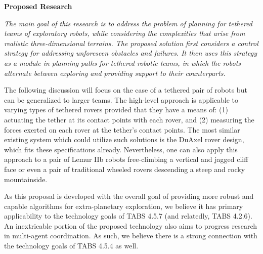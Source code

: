 \documentclass[12pt]{article}
\newcommand{\kostas}[1]{{\color{blue} #1}}
\begin{document}



{\bf\noindent Proposed Research}

{\sl The main goal of this research is to address the problem of
  planning for tethered teams of exploratory robots, while considering
  the complexities that arise from realistic three-dimensional
  terrains.  The proposed solution first considers a control strategy
  for addressing unforeseen obstacles and failures. It then uses this
  strategy as a module in planning paths for tethered robotic teams,
  in which the robots alternate between exploring and providing
  support to their counterparts.}

The following discussion will focus on the case of a tethered pair of
robots but can be generalized to larger teams. The high-level approach
is applicable to varying types of tethered rovers provided that they
have a means of: (1) actuating the tether at its contact points with
each rover, and (2) measuring the forces exerted on each rover at the
tether's contact points. The most similar existing system which could
utilize such solutions is the DuAxel rover design, which fits these
specifications already. Nevertheless, one can also apply this approach
to a pair of Lemur IIb robots free-climbing a vertical and jagged
cliff face or even a pair of traditional wheeled rovers descending a
steep and rocky mountainside.

As this proposal is developed with the overall goal of providing more robust and 
capable algorithms for extra-planetary exploration, we believe it has primary 
applicability to the technology goals of TABS 4.5.7 (and relatedly, TABS 4.2.6). 
An inextricable portion of the proposed technology also aims to progress 
research in multi-agent coordination. As such, we believe there is a strong 
connection with the technology goals of TABS 4.5.4 as well.  
\end{document}
